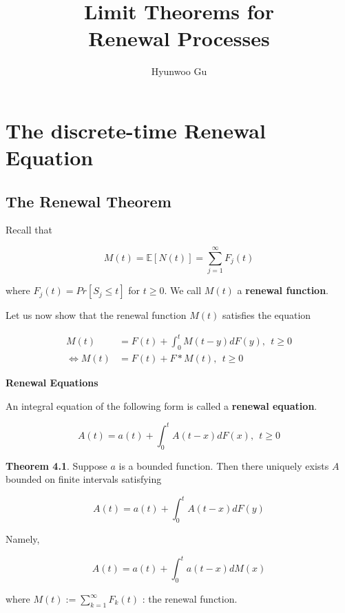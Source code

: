 \documentclass[12pt]{article}
\theoremstyle{nonumberbreak}
\begin{document}
\title{\textbf{Limit Theorems for \\ Renewal Processes}}
\author{Hyunwoo Gu}
\date{}

\maketitle

\section{The discrete-time Renewal Equation}

\subsection{The Renewal Theorem}

Recall that 

$$
M(t) = \mathbb{E} [ N(t) ] = \sum_{j=1}^\infty F_j(t)
$$

where $F_j(t) = Pr[ S_j \le t]$ for $t \ge 0$. We call $M(t)$ a \textbf{renewal function}.


Let us now show that the renewal function $M(t)$ satisfies the equation

$$
\begin{aligned}
M(t) &= F(t) + \int_0^t M(t-y) dF(y), \ \ t \ge 0 \\[8pt]
\Leftrightarrow M(t) &= F(t) + F \ast M(t), \ \ t \ge 0
\end{aligned}
$$



\textbf{Renewal Equations}

An integral equation of the following form is called a \textbf{renewal equation}. 

$$
A(t) = a(t) + \int_0^t A(t-x) dF(x), \ \ t \ge 0
$$


\begin{theorem}
\textbf{Theorem 4.1}. Suppose $a$ is a bounded function. Then there uniquely exists $A$ bounded on finite intervals satisfying

$$
A(t) = a(t) + \int_0^t A(t-x) dF(y)
$$


Namely, 

$$
A(t) = a(t) + \int_0^t a(t-x) dM(x)
$$

where $M(t) := \sum_{k=1}^\infty F_k(t)$ : the renewal function. 
\end{theorem}
\end{document}
